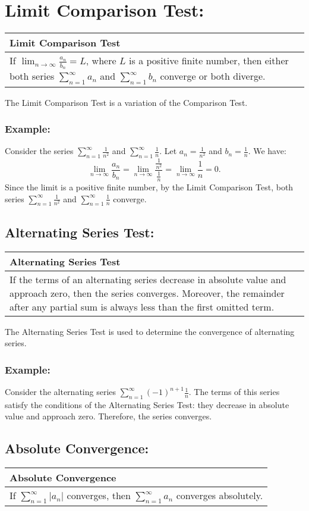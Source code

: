 \documentclass[12pt]{article}
\newcommand{\formula}[2]{
    {\renewcommand{\arraystretch}{2}
        \begin{center}
        \begin{tabular}{|p{0.9\textwidth}|}
        \hline
        \textbf{#1} \\
        \hline
        #2 \\
        \hline
        \end{tabular}
        \end{center}
    }
}
\begin{document}
\vspace{\baselineskip}
\vspace{\baselineskip}

\section{Limit Comparison Test: }
\formula{Limit Comparison Test}{
    If $\lim_{n \to \infty} \frac{a_n}{b_n} = L$, where $L$ is a positive finite number, then either both series $\sum_{n=1}^{\infty} a_n$ and $\sum_{n=1}^{\infty} b_n$ converge or both diverge.
}
The Limit Comparison Test is a variation of the Comparison Test.
\subsubsection{Example: }
Consider the series $\sum_{n=1}^{\infty} \frac{1}{n^2}$ and $\sum_{n=1}^{\infty} \frac{1}{n}$. Let $a_n = \frac{1}{n^2}$ and $b_n = \frac{1}{n}$. We have:
\[
\lim_{n \to \infty} \frac{a_n}{b_n} = \lim_{n \to \infty} \frac{\frac{1}{n^2}}{\frac{1}{n}} = \lim_{n \to \infty} \frac{1}{n} = 0.
\]
Since the limit is a positive finite number, by the Limit Comparison Test, both series $\sum_{n=1}^{\infty} \frac{1}{n^2}$ and $\sum_{n=1}^{\infty} \frac{1}{n}$ converge.

\vspace{\baselineskip}

\subsection{Alternating Series Test: }
\formula{Alternating Series Test}{
    If the terms of an alternating series decrease in absolute value and approach zero, then the series converges. Moreover, the remainder after any partial sum is always less than the first omitted term.
}
The Alternating Series Test is used to determine the convergence of alternating series.
\subsubsection{Example: }
Consider the alternating series $\sum_{n=1}^{\infty} (-1)^{n+1}\frac{1}{n}$. The terms of this series satisfy the conditions of the Alternating Series Test: they decrease in absolute value and approach zero. Therefore, the series converges.

\vspace{\baselineskip}

\subsection{Absolute Convergence: }
\formula{Absolute Convergence}{
    If $\sum_{n=1}^{\infty} |a_n|$ converges, then $\sum_{n=1}^{\infty} a_n$ converges absolutely.
}
\end{document}
